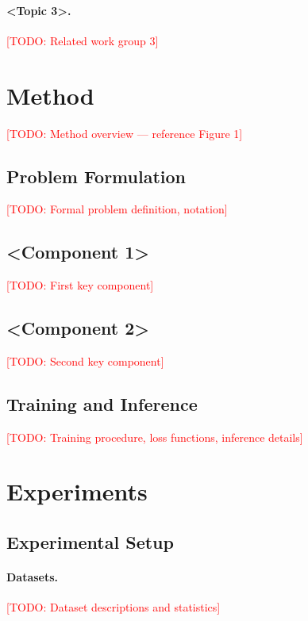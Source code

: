 \documentclass{article}
\newcommand{\todo}[1]{\textcolor{red}{[TODO: #1]}}
\begin{document}
\paragraph{<Topic 3>.}
\todo{Related work group 3}

\section{Method}
\label{sec:method}

\todo{Method overview — reference Figure 1}

\subsection{Problem Formulation}
\label{sec:formulation}
\todo{Formal problem definition, notation}

\subsection{<Component 1>}
\label{sec:component1}
\todo{First key component}

\subsection{<Component 2>}
\label{sec:component2}
\todo{Second key component}

\subsection{Training and Inference}
\label{sec:training}
\todo{Training procedure, loss functions, inference details}

\section{Experiments}
\label{sec:experiments}

\subsection{Experimental Setup}
\label{sec:setup}

\paragraph{Datasets.}
\todo{Dataset descriptions and statistics}
\end{document}
